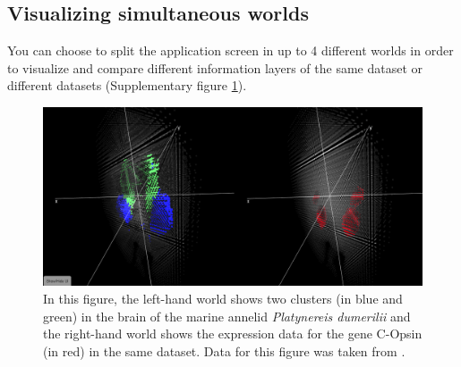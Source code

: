 \documentclass{bioinfo}
\begin{document}
\subsection{Visualizing simultaneous worlds}
You can choose to split the application screen in up to 4 different worlds in order to visualize and compare different information layers of the same dataset or different datasets (Supplementary figure \ref{fig:01}).
\begin{figure}[h!]%
\centerline{\includegraphics[totalheight=0.19\textheight]{Supp_fig1.png}}
\caption{In this figure, the left-hand world shows two clusters (in blue and green) in the brain of the marine annelid {\it Platynereis dumerilii} and the right-hand world shows the expression data for the gene C-Opsin (in red) in the same dataset. Data for this figure was taken from \citep{Tomer10}.}\label{fig:01}
\end{figure}
\end{document}
